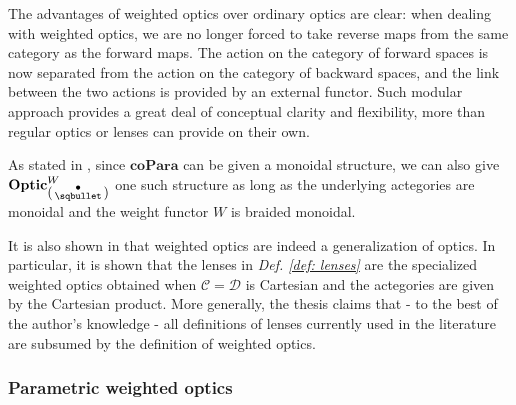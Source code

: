 \documentclass[12pt,a4paper,openright,twoside]{report}
\theoremstyle{plain}
\theoremstyle{definition}
\begin{document}
The advantages of weighted optics over ordinary optics are clear: when dealing with weighted optics, we are no longer forced to take reverse maps from the same category as the forward maps. The action on the category of forward spaces is now separated from the action on the category of backward spaces, and the link between the two actions is provided by an external functor. Such modular approach provides a great deal of conceptual clarity and flexibility, more than regular optics or lenses can provide on their own.


As stated in \cite{gavranovic2024fundamental}, since $\mathbf{coPara}$ can be given a monoidal structure, we can also give $\mathbf{Optic}^W_{\left(\begin{smallmatrix}\bullet\\\sqbullet\end{smallmatrix}\right)}$ one such structure as long as the underlying actegories are monoidal and the weight functor $W$ is braided monoidal.


It is also shown in \cite{gavranovic2024fundamental} that weighted optics are indeed a generalization of optics. In particular, it is shown that the lenses in \textit{Def. \ref{def: lenses}} are the specialized weighted optics obtained when $\mathcal{C} = \mathcal{D}$ is Cartesian and the actegories are given by the Cartesian product. More generally, the thesis claims that - to the best of the author's knowledge - all definitions of lenses currently used in the literature are subsumed by the definition of weighted optics.



\subsubsection{Parametric weighted optics}
\end{document}
